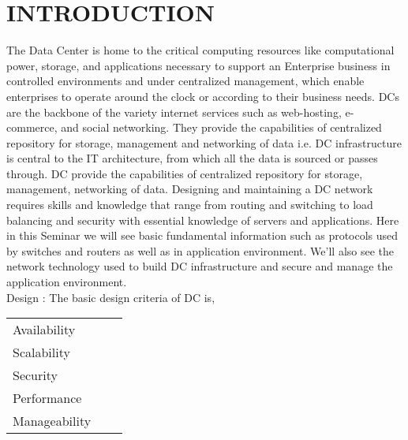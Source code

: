 \documentclass[12pt,a4paper]{report}
\begin{document}




\newpage




\pagestyle{fancy}




\chapter{INTRODUCTION}
The Data Center is home to the critical computing resources like computational power, storage, and applications necessary to support an Enterprise business in controlled environments and under centralized management, which enable enterprises to operate around the clock or according to their business needs. DCs are the backbone of the variety internet services such as web-hosting, e-commerce, and social networking. They provide the capabilities of centralized repository for storage, management and networking of data i.e. DC infrastructure is central to the IT architecture, from which all the data is sourced or passes through.
DC provide the capabilities of centralized repository for storage, management, networking of data. Designing and maintaining a DC network requires skills and knowledge that range from routing and switching to load balancing and security with essential knowledge of servers and applications. Here in this Seminar we will see basic fundamental information such as protocols used by switches and routers as well as in application environment. We’ll also see the network technology used to build DC infrastructure and secure and manage the application environment.\\
Design : The basic design criteria of DC is,\\
\begin{tabular}{lll}
\vspace{0.1 in}
 Availability & \\
\vspace{0.1 in}
	Scalability & \\
\vspace{0.1 in}
Security & \\
\vspace{0.1 in}
Performance & \\
\vspace{0.1 in}
Manageability & \\
\end{tabular}
\end{document}
